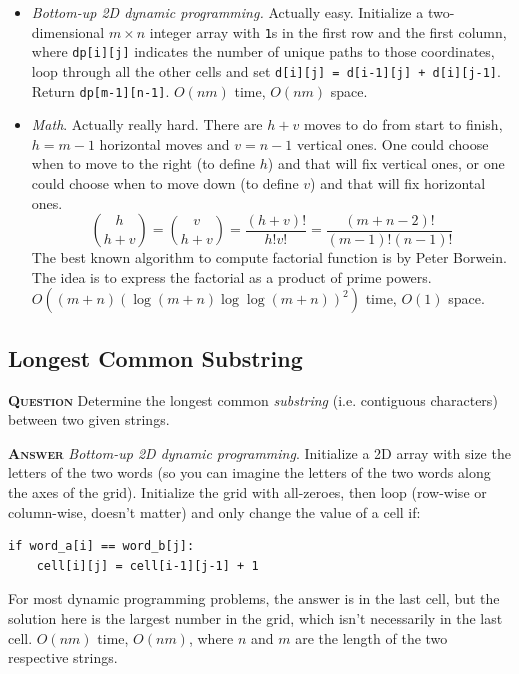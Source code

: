 \documentclass[table, xcdraw]{article}%
\begin{document}
\begin{itemize}
    \item \textit{Bottom-up 2D dynamic programming.} Actually easy. Initialize a two-dimensional $m \times n$ integer array with \texttt{1}s in the first row and the first column, where \texttt{dp[i][j]} indicates the number of unique paths to those coordinates, loop through all the other cells and set \texttt{d[i][j] = d[i-1][j] + d[i][j-1]}. Return \texttt{dp[m-1][n-1]}. $O(nm)$ time, $O(nm)$ space.
    \item \textit{Math}. Actually really hard. There are $h+v$ moves to do from start to finish, $h=m-1$ horizontal moves and $v=n-1$ vertical ones. One could choose when to move to the right (to define $h$) and that will fix vertical ones, or one could choose when to move down (to define $v$) and that will fix horizontal ones.
    \begin{equation}
        \binom{h}{h+v} = \binom{v}{h+v} = \frac{(h+v)!}{h!v!} = \frac{(m+n-2)!}{(m-1)!(n-1)!}
    \end{equation}
    The best known algorithm to compute factorial function is by Peter Borwein. The idea is to express the factorial as a product of prime powers. $O((m+n)(\log(m+n)\log\log(m+n))^2)$ time, $O(1)$ space.
\end{itemize}

\subsection{Longest Common Substring}

\textsc{\textbf{Question}} Determine the longest common \emph{substring} (i.e. contiguous characters) between two given strings.

\textsc{\textbf{Answer}} \textit{Bottom-up 2D dynamic programming}. Initialize a 2D array with size the letters of the two words (so you can imagine the letters of the two words along the axes of the grid). Initialize the grid with all-zeroes, then loop (row-wise or column-wise, doesn't matter) and only change the value of a cell if:

\begin{verbatim}
if word_a[i] == word_b[j]:
    cell[i][j] = cell[i-1][j-1] + 1
\end{verbatim}

For most dynamic programming problems, the answer is in the last cell, but the solution here is the largest number in the grid, which isn't necessarily in the last cell. $O(nm)$ time, $O(nm)$, where $n$ and $m$ are the length of the two respective strings.
\end{document}
